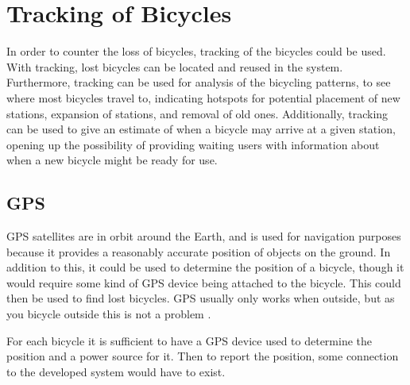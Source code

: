 \section{Tracking of Bicycles}
In order to counter the loss of bicycles, tracking of the bicycles could be used.
With tracking, lost bicycles can be located and reused in the system.
Furthermore, tracking can be used for analysis of the bicycling patterns, to see where most bicycles travel to, indicating hotspots for potential placement of new stations, expansion of stations, and removal of old ones.
Additionally, tracking can be used to give an estimate of when a bicycle may arrive at a given station, opening up the possibility of providing waiting users with information about when a new bicycle might be ready for use.

\subsection{GPS}
GPS satellites are in orbit around the Earth, and is used for navigation purposes because it provides a reasonably accurate position of objects on the ground.
In addition to this, it could be used to determine the position of a bicycle, though it would require some kind of GPS device being attached to the bicycle.
This could then be used to find lost bicycles.
GPS usually only works when outside, but as you bicycle outside this is not a problem \citep{misc:howgpsworks}.

For each bicycle it is sufficient to have a GPS device used to determine the position and a power source for it.
Then to report the position, some connection to the developed system would have to exist.
